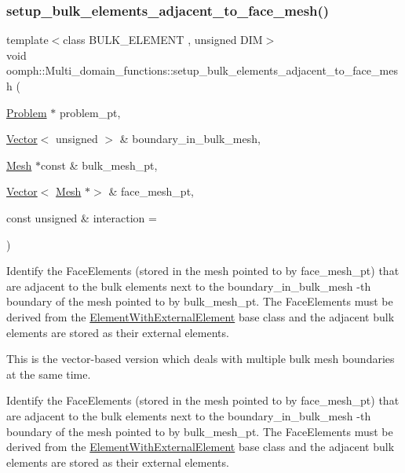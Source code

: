 \subsubsection{\texorpdfstring{setup\+\_\+bulk\+\_\+elements\+\_\+adjacent\+\_\+to\+\_\+face\+\_\+mesh()}{setup\_bulk\_elements\_adjacent\_to\_face\_mesh()}\hspace{0.1cm}{\footnotesize\ttfamily [1/2]}}
{\footnotesize\ttfamily template$<$class B\+U\+L\+K\+\_\+\+E\+L\+E\+M\+E\+NT , unsigned D\+IM$>$ \\
void oomph\+::\+Multi\+\_\+domain\+\_\+functions\+::setup\+\_\+bulk\+\_\+elements\+\_\+adjacent\+\_\+to\+\_\+face\+\_\+mesh (\begin{DoxyParamCaption}\item[{\hyperlink{classoomph_1_1Problem}{Problem} $\ast$}]{problem\+\_\+pt,  }\item[{\hyperlink{classoomph_1_1Vector}{Vector}$<$ unsigned $>$ \&}]{boundary\+\_\+in\+\_\+bulk\+\_\+mesh,  }\item[{\hyperlink{classoomph_1_1Mesh}{Mesh} $\ast$const \&}]{bulk\+\_\+mesh\+\_\+pt,  }\item[{\hyperlink{classoomph_1_1Vector}{Vector}$<$ \hyperlink{classoomph_1_1Mesh}{Mesh} $\ast$$>$ \&}]{face\+\_\+mesh\+\_\+pt,  }\item[{const unsigned \&}]{interaction = {} }\end{DoxyParamCaption})}



Identify the {\ttfamily Face\+Elements} (stored in the mesh pointed to by {\ttfamily face\+\_\+mesh\+\_\+pt}) that are adjacent to the bulk elements next to the {\ttfamily boundary\+\_\+in\+\_\+bulk\+\_\+mesh} -\/th boundary of the mesh pointed to by {\ttfamily bulk\+\_\+mesh\+\_\+pt}. The {\ttfamily Face\+Elements} must be derived from the {\ttfamily \hyperlink{classoomph_1_1ElementWithExternalElement}{Element\+With\+External\+Element}} base class and the adjacent bulk elements are stored as their external elements. 

This is the vector-\/based version which deals with multiple bulk mesh boundaries at the same time.

Identify the {\ttfamily Face\+Elements} (stored in the mesh pointed to by {\ttfamily face\+\_\+mesh\+\_\+pt}) that are adjacent to the bulk elements next to the {\ttfamily boundary\+\_\+in\+\_\+bulk\+\_\+mesh} -\/th boundary of the mesh pointed to by {\ttfamily bulk\+\_\+mesh\+\_\+pt}. The {\ttfamily Face\+Elements} must be derived from the {\ttfamily \hyperlink{classoomph_1_1ElementWithExternalElement}{Element\+With\+External\+Element}} base class and the adjacent bulk elements are stored as their external elements.

